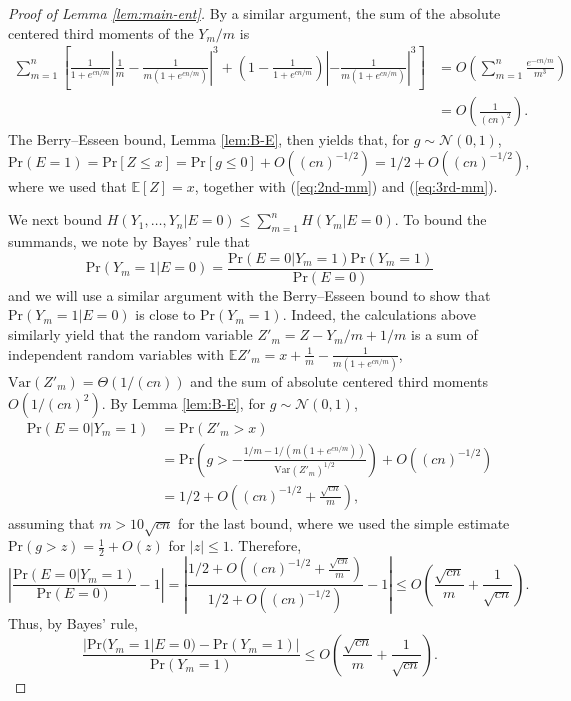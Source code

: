 \documentclass{daj}
\newcommand{\pr}{\mathrm{Pr}}
\begin{document}
\begin{proof}[Proof of Lemma \ref{lem:main-ent}]
By a similar argument, the sum of the absolute centered third moments of the $Y_m/m$ is 
\begin{align}\label{eq:3rd-mm}
    \sum_{m=1}^{n} \left[\frac{1}{1+e^{cn/m}} \left|\frac{1}{m}-\frac{1}{m(1+e^{cn/m})}\right|^3 + \left(1-\frac{1}{1+e^{cn/m}}\right) \left|-\frac{1}{m(1+e^{cn/m})}\right|^3 \right] &= O\left(\sum_{m=1}^{n} \frac{e^{-cn/m}}{m^3}\right) \nonumber\\
    &= O\left(\frac{1}{(cn)^2}\right). 
\end{align}
The Berry--Esseen bound, Lemma \ref{lem:B-E}, then yields that, for $g\sim \mathcal{N}(0,1)$, 
\begin{equation}\label{eq:pZ}
    \pr(E=1) = \pr[Z\le x] = \pr[g\le 0] + O((cn)^{-1/2}) = 1/2 + O((cn)^{-1/2}),
\end{equation}
where we used that $\mathbb{E}[Z]=x$, together with (\ref{eq:2nd-mm}) and (\ref{eq:3rd-mm}).

We next bound $H(Y_1,\dots,Y_n | E=0) \le \sum_{m=1}^{n} H(Y_m|E=0)$. To bound the summands, we note by Bayes' rule that  \[\pr(Y_m = 1|E=0) = \frac{\pr(E=0|Y_m=1)\pr(Y_m=1)}{\pr(E=0)}\]
and we will use a similar argument with the Berry--Esseen bound to show that $\pr(Y_m = 1|E=0)$ is close to $\pr(Y_m=1)$. 
Indeed, the calculations above similarly yield that the random variable $Z'_m=Z-Y_m/m+1/m$ is a sum of independent random variables with $\mathbb{E}Z'_m = x + \frac{1}{m} - \frac{1}{m(1+e^{cn/m})}$, $\mathrm{Var}(Z'_m) = \Theta(1/(cn))$ and the sum of absolute centered third moments $O(1/(cn)^2)$. 
By Lemma \ref{lem:B-E}, for $g\sim \mathcal{N}(0,1)$, 
\begin{align*}
    \pr(E = 0 | Y_m=1) &= \pr(Z'_m > x) \\
    &= \pr\left(g > -\frac{1/m-1/(m(1+e^{cn/m}))}{\mathrm{Var}(Z'_m)^{1/2}}\right) + O((cn)^{-1/2}) \\
    &= 1/2 + O\left((cn)^{-1/2}+\frac{\sqrt{cn}}{m}\right),
\end{align*}
assuming that $m > 10\sqrt{cn}$ for the last bound, where we used the simple estimate $\pr(g > z) = \frac{1}{2} + O(z)$ for $|z| \le 1$. 
Therefore,
\begin{equation*}
    \left|\frac{\pr(E=0|Y_m=1)}{\pr(E=0)} - 1 \right| = \left|\frac{1/2 + O\left((cn)^{-1/2}+\frac{\sqrt{cn}}{m}\right)}{1/2 + O((cn)^{-1/2})} - 1 \right| \le O\left(\frac{\sqrt{cn}}{m} + \frac{1}{\sqrt{cn}}\right). 
\end{equation*}
Thus, by Bayes' rule,
\begin{equation}\label{eq:prob-bound-1}
    \frac{|\pr(Y_m=1|E=0) - \pr(Y_m=1)|}{\pr(Y_m=1)} \le O\left(\frac{\sqrt{cn}}{m} + \frac{1}{\sqrt{cn}}\right). 
\end{equation}


\end{proof}
\end{document}

